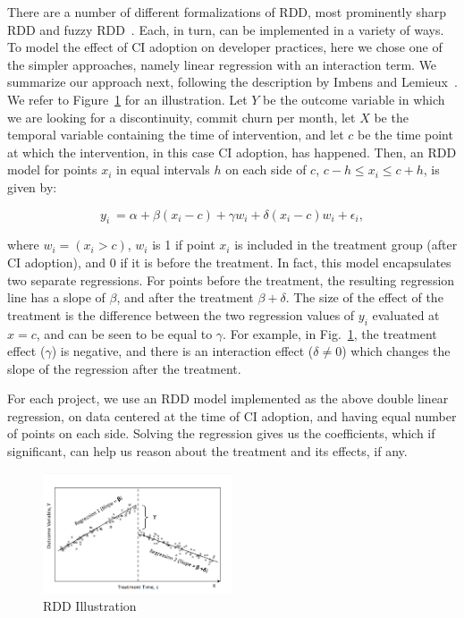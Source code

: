 There are a number of different formalizations of RDD, most prominently 
sharp RDD and fuzzy RDD~\cite{imbens2008regression}.
Each, in turn, can be implemented in a variety of ways.
To model the effect of CI adoption on developer practices, here we chose one 
of the simpler approaches, namely linear regression with an interaction term.
We summarize our approach next, following the description by Imbens and 
Lemieux~\cite{imbens2008regression}.
We refer to Figure~\ref{RDDIllustration} for an illustration.
Let $Y$ be the outcome variable in which we are looking for a discontinuity, 
\eg commit churn per month, let $X$ be the temporal variable containing the 
time of intervention, and let $c$ be the time point at which the intervention, in 
this case CI adoption, has happened.
Then, an RDD model for points $x_i$ in equal intervals $h$ on each side of 
$c$, $c-h \le x_i \le c+h$, is given by:

\[y_i \ = \alpha + \beta(x_i-c) + \gamma w_i + \delta(x_i-c)w_i + \epsilon_i,\]

\noindent where $w_i = (x_i > c)$, \ie $w_i$ is 1 if point $x_i$ is included in 
the treatment group (\eg after CI adoption), and 0 if it is before the treatment.
In fact, this model encapsulates two separate regressions.
For points before the treatment, the resulting regression line has a slope of 
$\beta$, and after the treatment $\beta + \delta$.
The size of the effect of the treatment is the difference between the two 
regression values of $y_i$ evaluated at $x=c$, and can be seen to be equal 
to $\gamma$.
For example, in Fig.~\ref{RDDIllustration}, the treatment effect ($\gamma$) is negative, and there is an interaction effect ($\delta \neq 0$) which changes the slope of the regression after the treatment.

For each project, we use an RDD model implemented as the above 
double linear regression, on data centered at the time of CI adoption, and 
having equal number of points on each side.
Solving the regression gives us the coefficients, which if significant, can help us reason about the treatment and its effects, if any.
 

\begin{figure}[t]
	\centering
	\includegraphics[width=0.5\textwidth, clip=true, trim=0 15 15 50]{RDD_plot.png}
	\caption{RDD Illustration}
	\label{RDDIllustration}
\end{figure}

